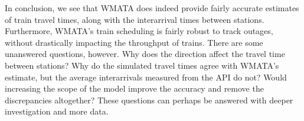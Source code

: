 \documentclass[a4paper,12pt]{article}
\begin{document}
In conclusion, we see that WMATA does indeed provide fairly accurate estimates of train travel times, along with the
interarrival times between stations. Furthermore, WMATA's train scheduling is fairly robust to track outages, without
drastically impacting the throughput of trains. There are some unanswered questions, however. Why does the direction
affect the travel time between stations? Why do the simulated travel times agree with WMATA's estimate, but the average
interarrivals measured from the API do not? Would increasing the scope of the model improve the accuracy and remove the
discrepancies altogether? These questions can perhaps be answered with deeper investigation and more data.



\end{document}
